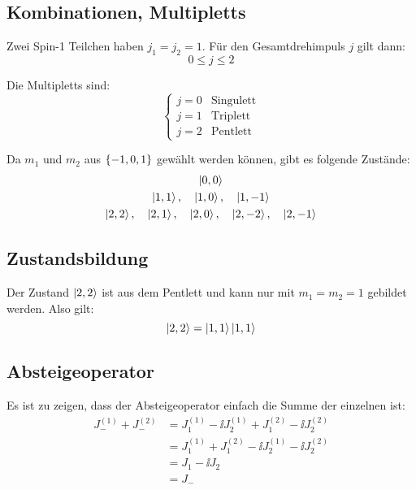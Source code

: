 \subsection{Kombinationen, Multipletts}

Zwei Spin-1 Teilchen haben $j_1 = j_2 = 1$. Für den Gesamtdrehimpuls $j$ gilt
dann:
\[
	0 \leq j \leq 2
\]

Die Multipletts sind:
\[
	\begin{cases}
		j = 0 & \text{Singulett} \\
		j = 1 & \text{Triplett} \\
		j = 2 & \text{Pentlett}
	\end{cases}
\]

Da $m_1$ und $m_2$ aus $\set{-1, 0, 1}$ gewählt werden können, gibt es folgende
Zustände:
\begin{gather*}
	\left| 0, 0 \right\rangle \\
	\left| 1, 1 \right\rangle 
	,\quad
	\left| 1, 0 \right\rangle 
	,\quad
	\left| 1, -1 \right\rangle \\
	\left| 2, 2 \right\rangle 
	,\quad
	\left| 2, 1 \right\rangle 
	,\quad
	\left| 2, 0 \right\rangle 
	,\quad
	\left| 2, -2 \right\rangle
	,\quad
	\left| 2, -1 \right\rangle
\end{gather*}

\subsection{Zustandsbildung}

Der Zustand $\left| 2, 2 \right\rangle$ ist aus dem Pentlett und kann nur mit $m_1 = m_2 = 1$
gebildet werden. Also gilt:
\[
	\left| 2, 2 \right\rangle = \left| 1, 1 \right\rangle \left| 1, 1 \right\rangle
\]

\subsection{Absteigeoperator}

Es ist zu zeigen, dass der Absteigeoperator einfach die Summe der einzelnen
ist:
\begin{align*}
	J_-^{(1)} + J_-^{(2)}
	&= J_1^{(1)} - \ii J_2^{(1)} + J_1^{(2)} - \ii J_2^{(2)} \\
	&= J_1^{(1)} + J_1^{(2)} - \ii J_2^{(1)} - \ii J_2^{(2)} \\
	&= J_1 - \ii J_2 \\
	&= J_-
\end{align*}


